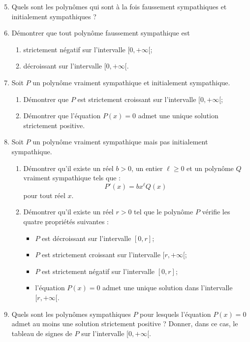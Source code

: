 \documentclass[landscape,twocolumn,leqno,a4paper,10pt]{report} %
\renewcommand{\geq}{\geqslant}
\begin{document}
\begin{enumerate}\setcounter{enumi}{4}
	\item Quels sont les polynômes qui sont à la fois faussement sympathiques et initialement sympathiques ?
	\item Démontrer que tout polynôme faussement sympathique est
	\begin{enumerate}
		\item strictement négatif sur l'intervalle $[0,+\infty[$;
		\item décroissant sur l'intervalle $[0,+\infty[$.
	\end{enumerate}
	\item Soit $P$ un polynôme vraiment sympathique et initialement sympathique.
	\begin{enumerate}
		\item Démontrer que $P$ est strictement croissant sur l'intervalle $[0,+\infty[$;
		\item Démontrer que l'équation $P(x)=0$ admet une unique solution strictement positive.
	\end{enumerate}
	\item Soit $P$ un polynôme vraiment sympathique mais pas initialement sympathique.
	\begin{enumerate}
		\item Démontrer qu'il existe un réel $b>0$, un entier $\ell \geq 0$ et un polynôme $Q$ vraiment sympathique tels que :
		$$P'(x)=b x^{\ell} Q(x)$$
pour tout réel $x$.
		\item Démontrer qu'il existe un réel $r>0$ tel que le polynôme $P$ vérifie les quatre propriétés suivantes :
		\begin{itemize}
			\item[$\triangleright$] $P$ est décroissant sur l'intervalle $[0, r]$;
			\item[$\triangleright$] $P$ est strictement croissant sur l'intervalle $[r,+\infty[$;
			\item[$\triangleright$] $P$ est strictement négatif sur l'intervalle $[0, r]$;
			\item[$\triangleright$] l'équation $P(x)=0$ admet une unique solution dans l'intervalle $[r,+\infty[$.
		\end{itemize}
	\end{enumerate}
	\item Quels sont les polynômes sympathiques $P$ pour lesquels l'équation $P(x)=0$ admet au moins une solution strictement positive ? Donner, dans ce cas, le tableau de signes de $P$ sur l'intervalle $[0,+\infty[$.
\end{enumerate}
\end{document}
